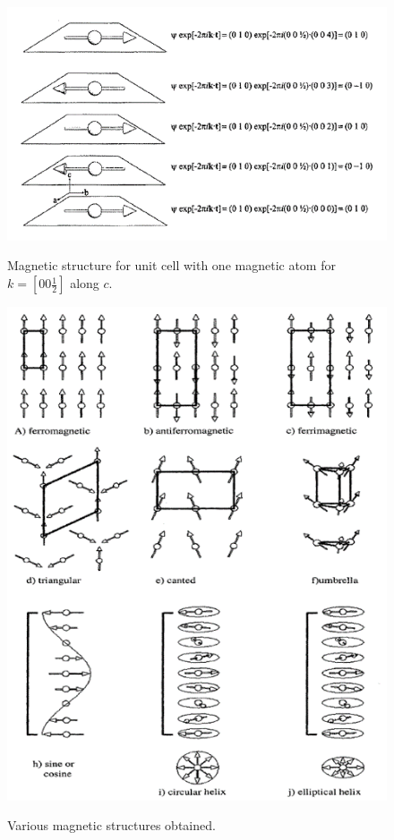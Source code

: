 \documentclass[10pt,doublespacing,edeposit]{uiucthesis2020}
\begin{document}
\begin{mainmatter}
\begin{figure}
\centering\includegraphics[width=\columnwidth]{figures/ch4/propagation_vector.png} \\
\caption{\label{fig:propagation_vector}
Magnetic structure for unit cell with one magnetic atom for $k = [00\frac{1}{2}]$ along $c$.
}
\end{figure}

\begin{figure}
\centering\includegraphics[width=\columnwidth]{figures/ch4/mag_structures_single_k.png} \\
\caption{\label{fig:mag_structures_single_k}
Various magnetic structures obtained.
}
\end{figure}


\end{mainmatter}
\end{document}
